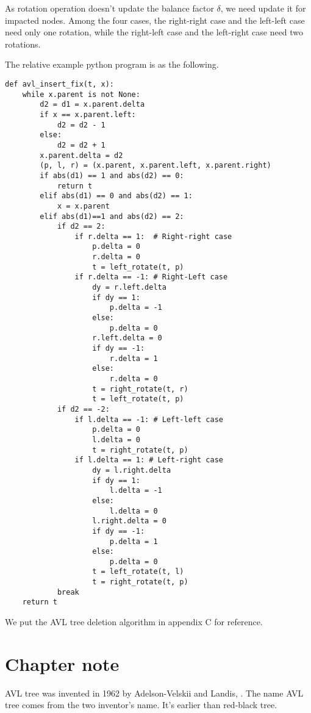 \documentclass[b5paper]{article}
\begin{document}
As rotation operation doesn't update the balance factor $\delta$,
we need update it for impacted nodes. Among the four cases, the right-right case and the left-left case need only one rotation, while the right-left case and the left-right case need two rotations.

The relative example python program is as the following.

\begin{lstlisting}
def avl_insert_fix(t, x):
    while x.parent is not None:
        d2 = d1 = x.parent.delta
        if x == x.parent.left:
            d2 = d2 - 1
        else:
            d2 = d2 + 1
        x.parent.delta = d2
        (p, l, r) = (x.parent, x.parent.left, x.parent.right)
        if abs(d1) == 1 and abs(d2) == 0:
            return t
        elif abs(d1) == 0 and abs(d2) == 1:
            x = x.parent
        elif abs(d1)==1 and abs(d2) == 2:
            if d2 == 2:
                if r.delta == 1:  # Right-right case
                    p.delta = 0
                    r.delta = 0
                    t = left_rotate(t, p)
                if r.delta == -1: # Right-Left case
                    dy = r.left.delta
                    if dy == 1:
                        p.delta = -1
                    else:
                        p.delta = 0
                    r.left.delta = 0
                    if dy == -1:
                        r.delta = 1
                    else:
                        r.delta = 0
                    t = right_rotate(t, r)
                    t = left_rotate(t, p)
            if d2 == -2:
                if l.delta == -1: # Left-left case
                    p.delta = 0
                    l.delta = 0
                    t = right_rotate(t, p)
                if l.delta == 1: # Left-right case
                    dy = l.right.delta
                    if dy == 1:
                        l.delta = -1
                    else:
                        l.delta = 0
                    l.right.delta = 0
                    if dy == -1:
                        p.delta = 1
                    else:
                        p.delta = 0
                    t = left_rotate(t, l)
                    t = right_rotate(t, p)
            break
    return t
\end{lstlisting}

We put the AVL tree deletion algorithm in appendix C for reference.

\section{Chapter note}
AVL tree was invented in 1962 by Adelson-Velskii and Landis\cite{wiki-avl},
\cite{TFATP}. The name AVL tree comes from the two inventor's name. It's earlier than red-black tree.
\end{document}
